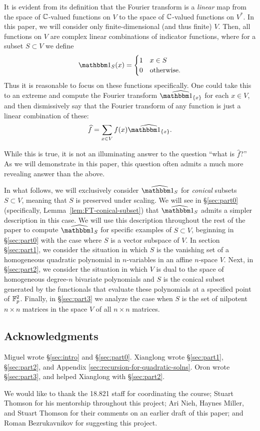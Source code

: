 It is evident from its definition that the Fourier transform is a \emph{linear} map from the space of $\mathbb{C}$-valued functions on $V$ to the space of $\mathbb{C}$-valued functions on $V^*$. In this paper, we will consider only finite-dimensional (and thus finite) $V$. Then, all functions on $V$ are complex linear combinations of indicator functions, where for a subset $S\subset V$ we define
\[ \IND_S(x) = \begin{cases}
1 & x \in S \\
0 & \text{otherwise.}     
\end{cases} \]
Thus it is reasonable to focus on these functions specifically. One could take this to an extreme and compute the Fourier transform $\widehat{\IND_{\{x\}}}$ for each $x\in V$, and then dismissively say that the Fourier transform of any function is just a linear combination of these:
\[
	\widehat{f} = \sum_{x\in V} f(x)\widehat{\IND_{\{x\}}}.
\]

While this is true, it is not an illuminating answer to the question ``what is $\widehat{f}$?'' As we will demonstrate in this paper, this question often admits a much more revealing answer than the above.

In what follows, we will exclusively consider $\widehat{\IND_S}$ for \emph{conical} subsets $S\subset V$, meaning that $S$ is preserved under scaling. We will see in \S\ref{sec:part0} (specifically, Lemma~\ref{lem:FT-conical-subset}) that $\widehat{\IND_S}$ admits a simpler description in this case. We will use this description throughout the rest of the paper to compute $\widehat{\IND_S}$ for specific examples of $S\subset V$, beginning in \S\ref{sec:part0} with the case where $S$ is a vector subspace of $V$. In section \S\ref{sec:part1}, we consider the situation in which $S$ is the vanishing set of a homogeneous quadratic polynomial in $n$-variables in an affine $n$-space $V$. Next, in \S\ref{sec:part2}, we consider the situation in which $V$ is dual to the space of homogeneous degree-$n$ bivariate polynomials and $S$ is the conical subset generated by the functionals that evaluate these polynomials at a specified point of $\mathbb{F}_p^2$. Finally, in \S\ref{sec:part3} we analyze the case when $S$ is the set of nilpotent $n\times n$ matrices in the space $V$ of all $n\times n$ matrices.

\subsection*{Acknowledgments} Miguel wrote \S\ref{sec:intro} and \S\ref{sec:part0}. Xianglong wrote \S\ref{sec:part1}, \S\ref{sec:part2}, and Appendix \ref{sec:recursion-for-quadratic-solns}. Oron wrote \S\ref{sec:part3}, and helped Xianglong with \S\ref{sec:part2}.

We would like to thank the 18.821 staff for coordinating the course; Stuart Thomson for his mentorship throughout this project; Ari Nieh, Haynes Miller, and Stuart Thomson for their comments on an earlier draft of this paper; and Roman Bezrukavnikov for suggesting this project.

